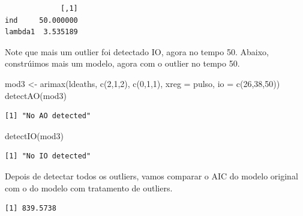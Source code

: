 \documentclass[
  letterpaper,
  DIV=11,
  numbers=noendperiod]{scrartcl}
\newenvironment{Shaded}{\begin{snugshade}}{\end{snugshade}}
\newcommand{\AttributeTok}[1]{\textcolor[rgb]{0.40,0.45,0.13}{#1}}
\newcommand{\DecValTok}[1]{\textcolor[rgb]{0.68,0.00,0.00}{#1}}
\newcommand{\FunctionTok}[1]{\textcolor[rgb]{0.28,0.35,0.67}{#1}}
\newcommand{\NormalTok}[1]{\textcolor[rgb]{0.00,0.23,0.31}{#1}}
\newcommand{\OtherTok}[1]{\textcolor[rgb]{0.00,0.23,0.31}{#1}}
\newcommand{\SpecialCharTok}[1]{\textcolor[rgb]{0.37,0.37,0.37}{#1}}
\theoremstyle{plain}
\theoremstyle{plain}
\theoremstyle{definition}
\theoremstyle{definition}
\theoremstyle{remark}
\begin{document}
\begin{verbatim}
             [,1]
ind     50.000000
lambda1  3.535189
\end{verbatim}

Note que mais um outlier foi detectado IO, agora no tempo 50. Abaixo,
constrúimos mais um modelo, agora com o outlier no tempo 50.

\begin{Shaded}
\begin{Highlighting}[]
\NormalTok{mod3 }\OtherTok{\textless{}{-}} \FunctionTok{arimax}\NormalTok{(ldeaths, }\FunctionTok{c}\NormalTok{(}\DecValTok{2}\NormalTok{,}\DecValTok{1}\NormalTok{,}\DecValTok{2}\NormalTok{), }\FunctionTok{c}\NormalTok{(}\DecValTok{0}\NormalTok{,}\DecValTok{1}\NormalTok{,}\DecValTok{1}\NormalTok{), }\AttributeTok{xreg =}\NormalTok{ pulso, }\AttributeTok{io =} \FunctionTok{c}\NormalTok{(}\DecValTok{26}\NormalTok{,}\DecValTok{38}\NormalTok{,}\DecValTok{50}\NormalTok{))}
\FunctionTok{detectAO}\NormalTok{(mod3)}
\end{Highlighting}
\end{Shaded}

\begin{verbatim}
[1] "No AO detected"
\end{verbatim}

\begin{Shaded}
\begin{Highlighting}[]
\FunctionTok{detectIO}\NormalTok{(mod3)}
\end{Highlighting}
\end{Shaded}

\begin{verbatim}
[1] "No IO detected"
\end{verbatim}

Depois de detectar todos os outliers, vamos comparar o AIC do modelo
original com o do modelo com tratamento de outliers.

\begin{Shaded}
\end{Shaded}

\begin{verbatim}
[1] 839.5738
\end{verbatim}

\begin{Shaded}
\end{Shaded}
\end{document}
